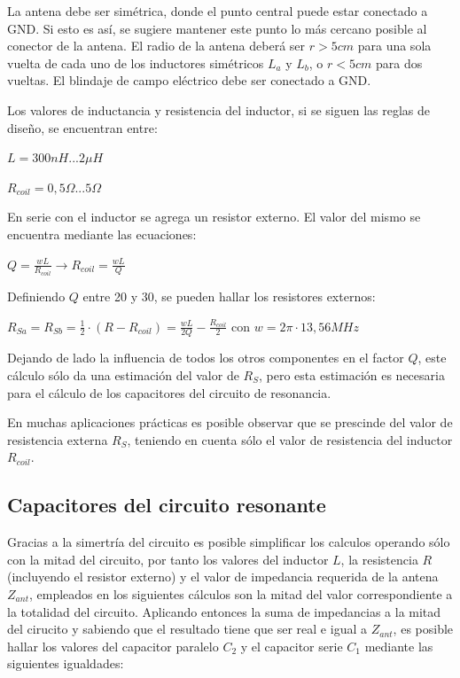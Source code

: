 La antena debe ser simétrica, donde el punto central puede estar conectado a GND. Si esto es así, se sugiere mantener este punto lo más cercano posible al conector de la antena.
El radio de la antena deberá ser $r > 5cm$ para una sola vuelta de cada uno de los inductores simétricos $L_{a}$ y $L_{b}$, o $r < 5cm$ para dos vueltas.
El blindaje de campo eléctrico debe ser conectado a GND.

Los valores de inductancia y resistencia del inductor, si se siguen las reglas de diseño, se encuentran entre: 

$ L = 300nH {...} 2\mu H $

$ R_{coil} =0,5\Omega {...} 5\Omega $


\bigskip
\begin{itshape}
\end{itshape}


En serie con el inductor se agrega un resistor externo. El valor del mismo se encuentra mediante las ecuaciones:

\centerline{$ Q = \frac{w L}{R_{coil}} \rightarrow R_{coil} = \frac{w L}{Q}$}


Definiendo $Q$ entre 20 y 30, se pueden hallar los resistores externos:

$R_{Sa} = R_{Sb} = \frac{1}{2} \cdot (R - R_{coil}) = \frac{wL}{2Q} - \frac{R_{coil}}{2}$ con $w = 2 \pi \cdot 13,56MHz$


Dejando de lado la influencia de todos los otros componentes en el factor $Q$, este cálculo sólo da una estimación del valor de $R_{S}$, pero esta estimación es necesaria para el cálculo de los capacitores del circuito de resonancia. 

\bigskip
\bigskip
	En muchas aplicaciones prácticas es posible observar que se prescinde del valor de 	resistencia externa $R_{S}$, teniendo en cuenta sólo el valor de resistencia del inductor $R_{coil}$.	

\subsection{Capacitores del circuito resonante}
Gracias a la simertría del circuito es posible simplificar los calculos operando sólo con la mitad del circuito, por tanto los valores del inductor $L$, la resistencia $R$ (incluyendo el resistor externo) y el valor de impedancia requerida de la antena $Z_{ant}$, empleados en los siguientes cálculos son la mitad del valor correspondiente a la totalidad del circuito. 
Aplicando entonces la suma de impedancias a la mitad del cirucito y sabiendo que el resultado tiene que ser real e igual a $Z_{ant}$, es posible hallar los valores del capacitor paralelo $C_{2}$ y el capacitor serie $C_{1}$ mediante las siguientes igualdades:

